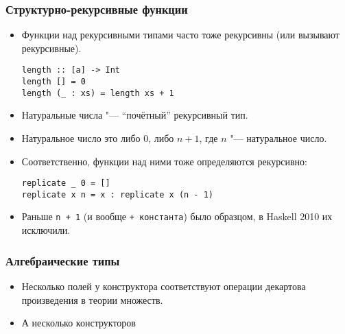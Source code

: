 \documentclass[10pt]{beamer}
\begin{document}
\begin{frame}[fragile]
\frametitle{Структурно-рекурсивные функции}
\begin{itemize}
    \item Функции над рекурсивными типами часто тоже рекурсивны (или вызывают рекурсивные).
\begin{lstlisting}
length :: [a] -> Int
length [] = 0
length (_ : xs) = length xs + 1
\end{lstlisting}
    \item Натуральные числа "--- \enquote{почётный} рекурсивный тип.
    \pause
    \item Натуральное число это либо $0$, либо $n + 1$, где $n$ "--- натуральное число.
    \item Соответственно, функции над ними тоже определяются рекурсивно:
\begin{lstlisting}
replicate _ 0 = []
replicate x n = x : replicate x (n - 1)
\end{lstlisting}
\item Раньше \lstinline|n + 1| (и вообще \lstinline|+ константа|) было образцом, в Haskell 2010 их исключили.
\end{itemize}
\end{frame}

\begin{frame}[fragile]
\frametitle{Алгебраические типы}
\begin{itemize}
    \item Несколько полей у конструктора соответствуют операции декартова произведения в теории множеств.
    \item А несколько конструкторов
\end{itemize}
\end{frame}
\end{document}
